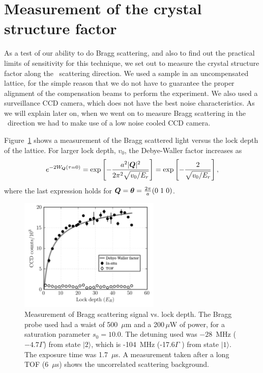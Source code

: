 \section{ Measurement of the crystal structure factor} 

As a test of our ability to do Bragg scattering, and also to find out the
practical limits of sensitivity for this technique, we set out to measure the
crystal structure factor along the \zoz\ scattering direction.  We used a
sample in an uncompensated lattice, for the simple reason that we do not have
to guarantee the proper alignment of the compensation beams to perform the
experiment.  We also used a surveillance CCD camera, which does not have the
best noise characteristics.   As we will explain later on, when we went on to
measure Bragg scattering in the \hhh\ direction we had to make use of a low
noise cooled CCD camera. 

Figure~\ref{fig:100dwfactor} shows a measurement of the Bragg
scattered light versus the lock depth of the lattice.  For larger lock depth,
$v_{0}$, the Debye-Waller factor increases as 
\begin{equation}
   e^{-2W_{\bm{Q}}(\tau=0)}   = \exp\left[
-\frac{a^{2}|\bm{Q}|^{2}}{2\pi^{2}\sqrt{v_{0}/E_{r}}} \right] = \exp\left[ -
\frac{2}{\sqrt{v_{0}/E_{r}}} \right], 
\end{equation}
where the last expression holds for $\bm{Q}=\bm{\theta} = \frac{2\pi}{a}(0\hspace{0.3em}1\hspace{0.3em}0)$.
\begin{figure}
    \centering
\includegraphics[width=0.6\textwidth]{../figures/braggscatt/dwfactorNice2.png}
\caption{\small  Measurement of Bragg scattering signal vs. lock depth.  The
Bragg probe used had a waist of 500~$\mu$m and a 200\,$\mu$W of power, for a
saturation parameter $s_{0}=10.0$.   The detuning used was $-28$~MHz
($-4.7\Gamma$) from state $|2\rangle$, which is -104~MHz (-17.6$\Gamma$ ) from
state $|1\rangle$.  The exposure time was 1.7~$\mu$s. A measurement taken after
a long TOF (6~$\mu$s) shows the uncorrelated scattering background.   }
\label{fig:100dwfactor}
\end{figure}

